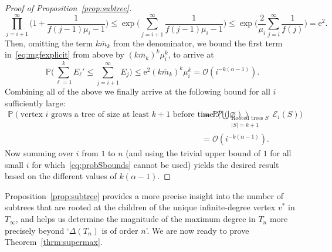 \documentclass[11pt]{article}
\numberwithin{equation}{section}
\renewcommand{\P}{\mathbb{P}} %
\newcommand{\be}{\begin{equation}}
\newcommand{\ee}{\end{equation}}
\newcommand{\ba}{\begin{aligned}}
\newcommand{\ea}{\end{aligned}}
\newcommand{\e}{\mathrm e}
\def\cE{{\mathcal E}}
\def\cO{{\mathcal O}}
\def\cP{{\mathcal P}}
\theoremstyle{definition}
\begin{document}
\begin{proof}[Proof of Proposition~\ref{prop:subtree}]
    \be 
    \prod_{j=i+1}^\infty \Big(1+\frac{1}{f(j-1)\mu_i-1}\Big)\leq \exp\bigg(\sum_{j=i+1}^\infty \frac{1}{f(j-1)\mu_i-1}\bigg)\leq \exp\bigg(\frac{2}{\mu_i}\sum_{j=i}^\infty \frac{1}{f(j)}\bigg)=\e^2.
    \ee 
    Then, omitting the term $k\overline m_k$ from the denominator, we bound the first term in~\eqref{eq:mgfexplicit} from above by $(k\overline m_k)^k \mu_i^k$, to arrive at
    \be 
     \P\bigg(\sum_{\ell=1}^k E_\ell'\leq \sum_{j=i+1}^\infty E_j\bigg)\leq \e^2 (k\overline m_k)^k \mu_i^k=\cO(i^{-k(\alpha-1)}).
    \ee 
    Combining all of the above we finally arrive at the following bound for all $i$ sufficiently large:
    \be \ba\label{eq:probSbounds}
    \P(\text{vertex $i$ grows a tree of size at least $k+1$ before time $\cP(\varnothing)$})&=\P\bigg( \bigcup_{\substack{\text{Rooted trees }S\\ |S|=k+1}}\!\!\!\!\!\!\cE_i(S)\bigg)\\
    &=\cO(i^{-k(\alpha-1)}).
    \ea \ee
    Now summing over $i$ from $1$ to $n$ (and using the trivial upper bound of $1$ for all small $i$ for which~\eqref{eq:probSbounds} cannot be used) yields the desired result based on the different values of $k(\alpha-1)$.
\end{proof}

Proposition~\ref{prop:subtree} provides a more precise insight into the number of subtrees that are rooted at the children of the unique infinite-degree vertex $v^*$ in $T_\infty$, and helps us determine the magnitude of the maximum degree in $T_n$ more precisely beyond `$\Delta(T_n)$ is of order $n$'. We are now ready to prove Theorem~\ref{thrm:supermax}.
\end{document}
